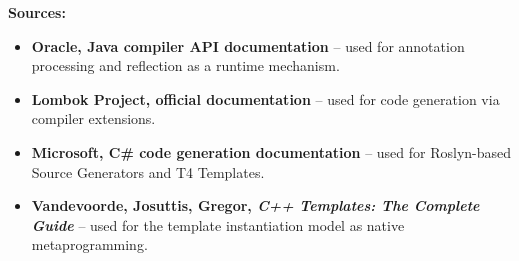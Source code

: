 \documentclass[11pt]{report}
\begin{document}
\noindent\textbf{Sources:}
\begin{itemize}
\item \textbf{Oracle, Java compiler API documentation} \cite{oracle_java_compiler_apis} -- used for annotation processing and reflection as a runtime mechanism.
\item \textbf{Lombok Project, official documentation} \cite{lombok_project} -- used for code generation via compiler extensions.
\item \textbf{Microsoft, C\# code generation documentation} \cite{microsoft_code_generation} -- used for Roslyn-based Source Generators and T4 Templates.
\item \textbf{Vandevoorde, Josuttis, Gregor, \emph{C++ Templates: The Complete Guide}} \cite{cpp_templates2017} -- used for the template instantiation model as native metaprogramming.
\end{itemize}



\end{document}
